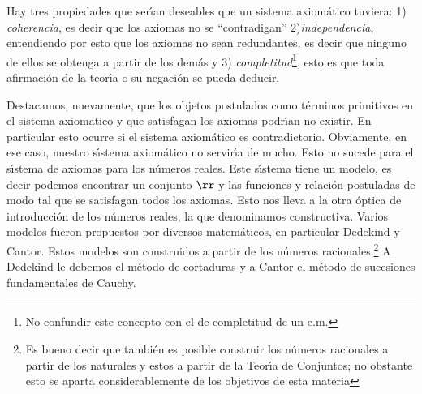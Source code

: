   Hay tres propiedades que
  ser\'{\i}an deseables que un sistema axiomático tuviera: 1)
  \emph{coherencia}, es decir que los axiomas no se
  ``contradigan'' 2)\emph{independencia}, entendiendo por esto que
  los axiomas no sean redundantes, es decir que ninguno de ellos
  se obtenga a partir de los demás y 3)
  \emph{completitud}\footnote{No confundir este concepto con el de
  completitud de un e.m.}, esto es que toda afirmación de la
  teor\'{\i}a o su negación se pueda deducir.

  Destacamos,
  nuevamente, que los objetos postulados como términos
  primitivos en el sistema axiomatico y que satisfagan los axiomas
  podr\'{\i}an no existir. En particular esto ocurre si el sistema
  axiomático es contradictorio. Obviamente, en ese caso, nuestro
  s\'{\i}stema axiomático no servir\'{\i}a de mucho. Esto no sucede para el
  s\'{\i}stema de axiomas para los números reales. Este
  s\'{\i}stema tiene un modelo, es decir podemos encontrar un
  conjunto $\rr$ y las funciones y relación postuladas de modo
  tal que se satisfagan todos los axiomas. Esto nos lleva a la otra óptica de
  introducción de los números reales, la que denominamos constructiva. Varios
  modelos fueron propuestos por diversos matemáticos, en
  particular Dedekind y Cantor. Estos modelos
  son construidos a partir de los números racionales.\footnote{Es bueno
  decir que también es posible construir los números
  racionales a partir de los naturales y estos a partir de la
  Teor\'{\i}a de Conjuntos; no obstante esto se aparta
  considerablemente de los objetivos de esta materia} A Dedekind
  le debemos el método de cortaduras y a Cantor el método de
  sucesiones fundamentales de Cauchy.

